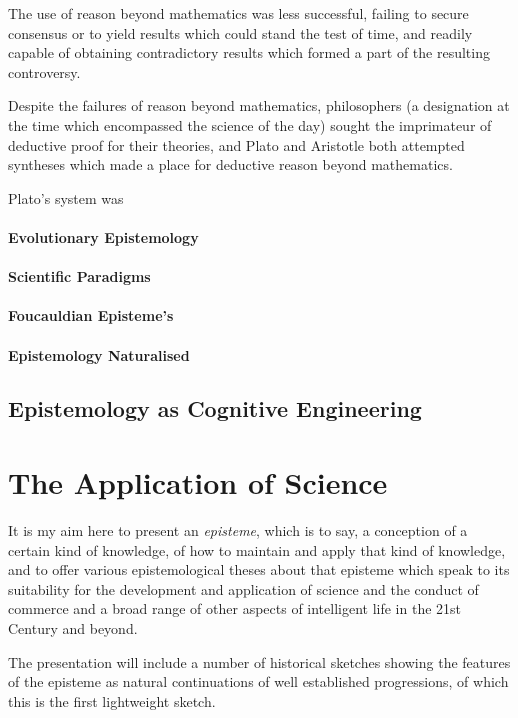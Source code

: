 \documentclass[10pt,titlepage]{book}
\begin{document}
The use of reason beyond mathematics was less successful, failing to secure consensus or to yield results which could stand the test of time, and readily capable of obtaining contradictory results which formed a part of the resulting controversy.

Despite the failures of reason beyond mathematics, philosophers (a designation at the time which encompassed the science of the day) sought the imprimateur of deductive proof for their theories, and Plato and Aristotle both attempted syntheses which made a place for deductive reason beyond mathematics.

Plato's system was 

\paragraph{Evolutionary Epistemology}

\paragraph{Scientific Paradigms}

\paragraph{Foucauldian Episteme's}

\paragraph{Epistemology Naturalised}

\subsection{Epistemology as Cognitive Engineering}

\section{The Application of Science}

It is my aim here to present an \emph{episteme}, which is to say, a conception of a certain kind of knowledge, of how to maintain and apply that kind of knowledge, and to offer various epistemological theses about that episteme which speak to its suitability for the development and application of science and the conduct of commerce and a broad range of other aspects of intelligent life in the 21st Century and beyond.

The presentation will include a number of historical sketches showing the features of the  episteme as natural continuations of well established progressions, of which this is the first lightweight sketch.
\end{document}
